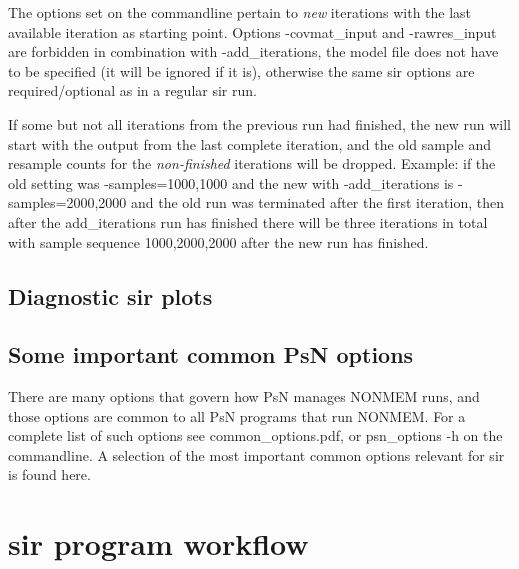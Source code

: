\begin{optionlist}
The options set on the commandline 
pertain to \emph{new} iterations with the last available iteration as starting point.
Options -covmat\_input and -rawres\_input are forbidden in combination with -add\_iterations, 
the model file does not have to be specified (it will be ignored if it is),
otherwise the same sir options are required/optional as in a regular sir run.

If some but not all iterations from the previous run had finished, the new run will start with the output
from the last complete iteration, and the old sample and resample counts for
the \emph{non-finished} iterations will be dropped. Example: if the old setting was -samples=1000,1000
and the new with -add\_iterations 
is -samples=2000,2000 and the old run was terminated after the first iteration,
then after the add\_iterations run has finished
there will be three iterations in total with sample sequence 1000,2000,2000 
after the new run has finished.

\nextopt
\end{optionlist}


\subsection{Diagnostic sir plots}
\newcommand{\rplotsconditions}{
See section Output, subsections Basic and Extended diagnostic plots,
for descriptions of the default sir plots.
The default sir template 
requires 
that R libraries
gplots, ggplot2, plyr, dplyr, caTools, reshape, gridExtra, RColorBrewer and tidyr are installed.
If the conditions are not fulfilled then no pdf will be generated,
see the .Rout file in the main run directory for error messages.
}



 

\subsection{Some important common PsN options}
There are many options that govern how PsN manages NONMEM runs, and
those options are common to all PsN programs that run NONMEM.
For a complete list of such options see common\_options.pdf, 
or psn\_options -h on the commandline. A selection of
the most important common options relevant for sir is found here.



\section{sir program workflow}
